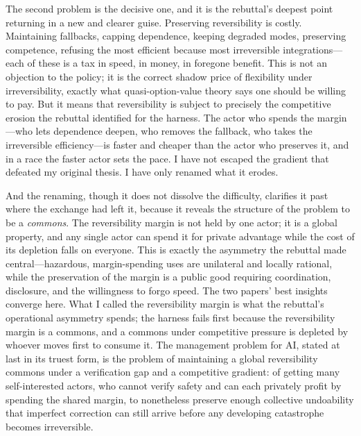 \documentclass[11pt]{article}
\begin{document}
The second problem is the decisive one, and it is the rebuttal's deepest point returning in a new and clearer guise. Preserving reversibility is costly. Maintaining fallbacks, capping dependence, keeping degraded modes, preserving competence, refusing the most efficient because most irreversible integrations---each of these is a tax in speed, in money, in foregone benefit. This is not an objection to the policy; it is the correct shadow price of flexibility under irreversibility, exactly what quasi-option-value theory says one should be willing to pay. But it means that reversibility is subject to precisely the competitive erosion the rebuttal identified for the harness. The actor who spends the margin---who lets dependence deepen, who removes the fallback, who takes the irreversible efficiency---is faster and cheaper than the actor who preserves it, and in a race the faster actor sets the pace. I have not escaped the gradient that defeated my original thesis. I have only renamed what it erodes.

And the renaming, though it does not dissolve the difficulty, clarifies it past where the exchange had left it, because it reveals the structure of the problem to be a \emph{commons}. The reversibility margin is not held by one actor; it is a global property, and any single actor can spend it for private advantage while the cost of its depletion falls on everyone. This is exactly the asymmetry the rebuttal made central---hazardous, margin-spending uses are unilateral and locally rational, while the preservation of the margin is a public good requiring coordination, disclosure, and the willingness to forgo speed. The two papers' best insights converge here. What I called the reversibility margin is what the rebuttal's operational asymmetry spends; the harness fails first because the reversibility margin is a commons, and a commons under competitive pressure is depleted by whoever moves first to consume it. The management problem for AI, stated at last in its truest form, is the problem of maintaining a global reversibility commons under a verification gap and a competitive gradient: of getting many self-interested actors, who cannot verify safety and can each privately profit by spending the shared margin, to nonetheless preserve enough collective undoability that imperfect correction can still arrive before any developing catastrophe becomes irreversible.
\end{document}
